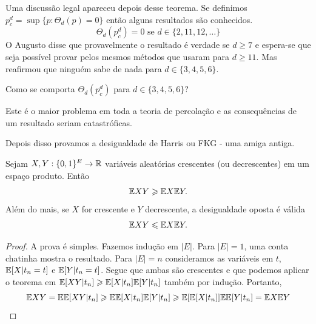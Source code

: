 Uma discussão legal apareceu depois desse teorema. Se definimos
$p_c^d = \sup \{p : \Theta_d(p) = 0\}$
então alguns resultados são conhecidos.
\begin{equation*}
	\Theta_d(p_c^d) = 0 \text{ se } d \in \{2,11,12,\dots\}
\end{equation*}
O Augusto disse que provavelmente o resultado é verdade se $d \geq 7$
e espera-se que seja possível provar
pelos mesmos métodos que usaram para $d \geq 11$. Mas reafirmou que
ninguém sabe de nada para $d \in \{3,4,5,6\}$.
\begin{question}
	\label{question:theta_pc}
	Como se comporta $\Theta_d(p_c^d)$ para $d \in \{3,4,5,6\}$?
\end{question}
Este é o maior problema em toda a teoria de percolação e as
consequências de um resultado seriam catastróficas.

Depois disso provamos a desigualdade de Harris ou FKG - uma amiga antiga.
\begin{theorem}
	Sejam $X,Y : \{0,1\}^E \rightarrow \mathbb{R}$ variáveis aleatórias crescentes (ou
	decrescentes) em um espaço produto. Então
	\[
		\mathbb{E} XY \geqslant \mathbb{E} X \mathbb{E} Y.
	\]
	Além do mais, se $X$ for crescente e $Y$ decrescente, a desigualdade
	oposta é válida
	\[
		\mathbb{E} XY \leqslant \mathbb{E} X \mathbb{E} Y.
	\]
\end{theorem}
\begin{proof}
	A prova é simples. Fazemos indução em $|E|$. Para $|E| = 1$, uma
	conta chatinha mostra o resultado.
	Para $|E| = {n}$ consideramos as variáveis em $t$, $\mathbb{E}[X | t_n =
	t]$ e $\mathbb{E}[Y | t_n = t]$.
	Segue que ambas são crescentes e que podemos aplicar o teorema em
	$\mathbb{E}[XY|t_n] \geqslant \mathbb{E}[X|t_n]\mathbb{E}[Y|t_n]$ também por indução. Portanto,
	\[\mathbb{E} XY = \mathbb{E}\mathbb{E}[XY | t_n] \geqslant \mathbb{E} \mathbb{E}[X|t_n]\mathbb{E}[Y|t_n] \geqslant
	\mathbb{E}[\mathbb{E}[X|t_n]]\mathbb{E}\mathbb{E}[Y|t_n] = \mathbb{E} X \mathbb{E} Y\]
\end{proof}
